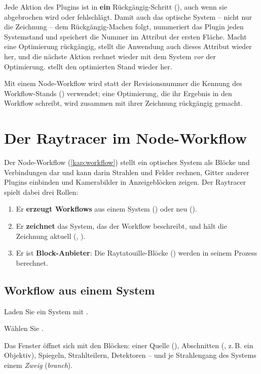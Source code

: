 Jede Aktion des Plugins ist in \produkt{} \textbf{ein} Rückgängig-Schritt (),
auch wenn sie abgebrochen wird oder fehlschlägt. Damit auch das optische System -- nicht nur
die Zeichnung -- dem Rückgängig-Machen folgt, nummeriert das Plugin jeden Systemstand und
speichert die Nummer im Attribut  der ersten Fläche. Macht
 eine Optimierung rückgängig, stellt die Anwendung auch dieses Attribut wieder
her, und die nächste Aktion rechnet wieder mit dem System \emph{vor} der Optimierung.
 stellt den optimierten Stand wieder her.

Mit einem Node-Workflow wird statt der Revisionsnummer die Kennung des Workflow-Stands
() verwendet; eine Optimierung, die ihr Ergebnis in den Workflow schreibt,
wird zusammen mit ihrer Zeichnung rückgängig gemacht.

\section{Der Raytracer im Node-Workflow}\label{sec:rt-workflow}

Der Node-Workflow (\autoref{kap:workflow}) stellt ein optisches System als Blöcke und
Verbindungen dar und kann darin Strahlen und Felder rechnen, Gitter anderer Plugins einbinden und
Kamerabilder in Anzeigeblöcken zeigen. Der Raytracer spielt dabei drei Rollen:

\begin{enumerate}
  \item Er \textbf{erzeugt Workflows} aus einem System () oder neu
    ().
  \item Er \textbf{zeichnet} das System, das der Workflow beschreibt, und hält die Zeichnung
    aktuell (, ).
  \item Er ist \textbf{Block-Anbieter}: Die Raytatouille-Blöcke () werden in seinem
    Prozess berechnet.
\end{enumerate}

\subsection{Workflow aus einem System}

\begin{schritte}
  \item Laden Sie ein System mit .
  \item Wählen Sie .
  \item Das Fenster  öffnet sich mit den Blöcken: einer Quelle
    (), Abschnitten (, z.\,B. ein Objektiv),
    Spiegeln, Strahlteilern, Detektoren -- und je Strahlengang des Systems einem
    \emph{Zweig} (\emph{branch}).
\end{schritte}

